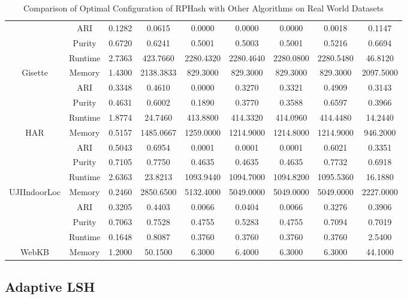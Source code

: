 \begin{table}
{\begin{tabular}{|c|c|c|c|c|c|c|c|c|}
 & ARI     & 0.1282 &     0.0615 &    0.0000 &    0.0000 &    0.0000 &    0.0018 &    0.1147 \\
 & Purity  & 0.6720 &     0.6241 &    0.5001 &    0.5003 &    0.5001 &    0.5216 &    0.6694 \\
 & Runtime & 2.7363 &   423.7660 & 2280.4320 & 2280.4640 & 2280.0800 & 2280.5480 &   46.8120 \\
\multirow{-4}{*}{Gisette}
 & Memory  & 1.4300 &  2138.3833 &  829.3000 &  829.3000 &  829.3000 &  829.3000 & 2097.5000 \\ \hline
 & ARI     & 0.3348 &     0.4610 &    0.0000 &    0.3270 &    0.3321 &    0.4909 &    0.3143 \\
 & Purity  & 0.4631 &     0.6002 &    0.1890 &    0.3770 &    0.3588 &    0.6597 &    0.3966 \\
 & Runtime & 1.8774 &    24.7460 &  413.8800 &  414.3320 &  414.0960 &  414.4480 &   14.2440 \\
\multirow{-4}{*}{HAR}
 & Memory  & 0.5157 &  1485.0667 & 1259.0000 & 1214.9000 & 1214.8000 & 1214.9000 &  946.2000 \\ \hline
 & ARI     & 0.5043 &     0.6954 &    0.0001 &    0.0001 &    0.0001 &    0.6021 &    0.3351 \\
 & Purity  & 0.7105 &     0.7750 &    0.4635 &    0.4635 &    0.4635 &    0.7732 &    0.6918 \\
 & Runtime & 2.6363 &    23.8213 & 1093.9440 & 1094.7000 & 1094.8200 & 1095.5360 &   16.1880 \\
\multirow{-4}{*}{UJIIndoorLoc}
  & Memory  & 0.2460 & 2850.6500 & 5132.4000 & 5049.0000 & 5049.0000 & 5049.0000 & 2227.0000 \\ \hline
  & ARI     & 0.3205 &    0.4403 &    0.0066 &    0.0404 &    0.0066 &    0.3276 &    0.3906 \\
  & Purity  & 0.7063 &    0.7528 &    0.4755 &    0.5283 &    0.4755 &    0.7094 &    0.7019 \\
  & Runtime & 0.1648 &    0.8087 &    0.3760 &    0.3760 &    0.3760 &    0.3760 &    2.5400 \\
\multirow{-4}{*}{WebKB}
 & Memory  & 1.2000 &    50.1500 &    6.3000 &    6.4000 &    6.3000 &    6.3000 &   44.1000 \\ \hline
\end{tabular}
}
\caption{Comparison of Optimal Configuration of \textsf{RPHash} with Other Algorithms on Real World
  Datasets}\label{compareOtherAlgo}  
\end{table}

\subsection{Adaptive LSH}

